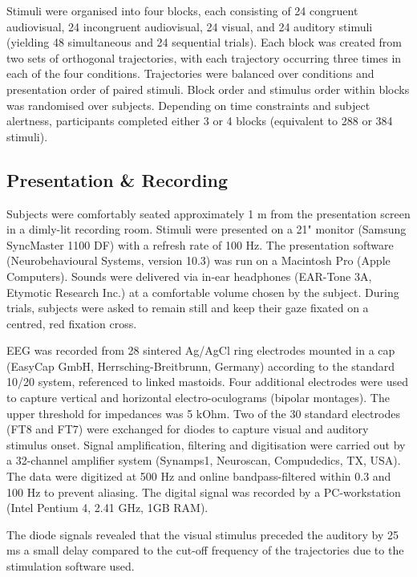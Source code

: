 Stimuli were organised into four blocks, each consisting of 24 congruent
audiovisual, 24 incongruent audiovisual, 24 visual, and 24 auditory stimuli
(yielding 48 simultaneous and 24 sequential trials). Each block was created
from two sets of orthogonal trajectories, with each trajectory occurring
three times in each of the four conditions. Trajectories were balanced over
conditions and presentation order of paired stimuli. Block order and
stimulus order within blocks was randomised over subjects. Depending on
time constraints and subject alertness, participants completed either 3 or
4 blocks (equivalent to 288 or 384 stimuli).



\subsection{Presentation \& Recording}

Subjects were comfortably seated approximately 1 m from the presentation
screen in a dimly-lit recording room. Stimuli were presented on a 21"
monitor (Samsung SyncMaster 1100 DF) with a refresh rate of 100 Hz. The
presentation software (Neurobehavioural Systems, version 10.3) was run on a
Macintosh Pro (Apple Computers). Sounds were delivered via in-ear
headphones (EAR-Tone 3A, Etymotic Research Inc.) at a comfortable volume
chosen by the subject. During trials, subjects were asked to remain still
and keep their gaze fixated on a centred, red fixation cross. 



EEG was recorded from 28 sintered Ag/AgCl ring electrodes mounted in a cap
(EasyCap GmbH, Herrsching-Breitbrunn, Germany) according to the standard
10/20 system, referenced to linked mastoids. Four additional electrodes
were used to capture vertical and horizontal electro-oculograms (bipolar
montages). The upper threshold for impedances was 5 kOhm. Two of the 30
standard electrodes (FT8 and FT7) were exchanged for diodes to capture
visual and auditory stimulus onset. Signal amplification, filtering and
digitisation were carried out by a 32-channel amplifier system (Synamps1,
Neuroscan, Compudedics, TX, USA). The data were digitized at 500 Hz and
online bandpass-filtered within 0.3 and 100 Hz to prevent aliasing. The
digital signal was recorded by a PC-workstation (Intel Pentium 4, 2.41 GHz,
1GB RAM).



The diode signals revealed that the visual stimulus preceded the auditory
by 25 ms \textemdash a small delay compared to the cut-off frequency of the
trajectories \textemdash due to the stimulation software used.


